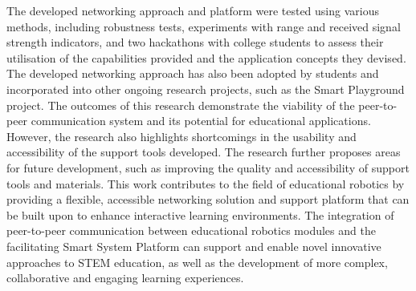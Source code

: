 The developed networking approach and platform were tested using various methods, including robustness tests, experiments with range and received signal strength indicators, and two hackathons with college students to assess their utilisation of the capabilities provided and the application concepts they devised. The developed networking approach has also been adopted by students and incorporated  into other ongoing research projects, such as the Smart Playground project. The outcomes of this research demonstrate the viability of the peer-to-peer communication system and its potential for educational applications. However, the research also highlights shortcomings in the usability and accessibility of the support tools developed. The research further proposes areas for future development, such as improving the quality and accessibility of support tools and materials. This work contributes to the field of educational robotics by providing a flexible, accessible networking solution and support platform that can be built upon to enhance interactive learning environments. The integration of peer-to-peer communication between educational robotics modules and the facilitating Smart System Platform can support and enable novel innovative approaches to STEM education, as well as the development of more complex, collaborative and engaging learning experiences.

